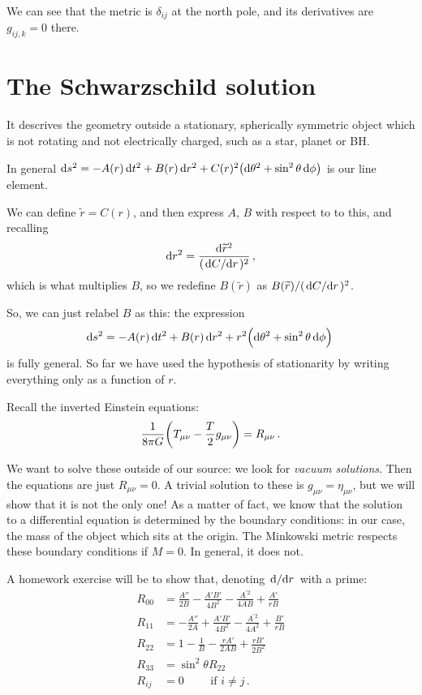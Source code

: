 \documentclass[main.tex]{subfiles}
\begin{document}
We can see that the metric is \(\delta_{ij}\) at the north pole, and its derivatives are \(g_{ij,k}= 0\) there.

\section{The Schwarzschild solution}

It descrives the geometry outside a stationary, spherically symmetric object which is not rotating and not electrically charged, such as a star, planet or BH.

In general \(\dd{s^2} = -A(r) \dd{t^2} + B(r) \dd{r^2} + C(r)^2 \qty(\dd{\theta^2} + \sin^2 \theta \dd{\phi })\) is our line element.

We can define \(\widetilde{r} = C(r)\), and then express \(A\), \(B\) with respect to to this, and recalling 
%
\begin{align}
    \dd{r^2} = 
  \frac{\dd{\widetilde{r}^2} }{(\dv*{C}{r})^2}
\,,
\end{align}
%
which is what multiplies \(B\), so we redefine \(B(\widetilde{r}) \) as \(B(\widetilde{r}) / (\dv*{C}{r})^2\).

So, we can just relabel \(B\) as this: the expression 
%
\begin{align}
    \dd{s^2} = -A(r) \dd{t^2} + B(r) \dd{r^2} + r^2\qty(\dd{\theta^2} + \sin^2 \theta \dd{\phi })
\,
\end{align}
%
is fully general. So far we have used the hypothesis of stationarity by writing everything only as a function of \(r\).

Recall the inverted Einstein equations: 
%
\begin{align}
  \frac{1}{8 \pi G} \qty(T_{\mu \nu } - \frac{T}{2} g_{\mu \nu }) = R_{\mu \nu }
\,.
\end{align}
%

We want to solve these outside of our source: we look for \emph{vacuum solutions}. Then the equations are just \(R_{\mu \nu } =0\).
A trivial solution to these is \(g_{\mu \nu } = \eta_{\mu \nu }\), but we will show that it is not the only one!
As a matter of fact, we know that the solution to a differential equation is determined by the boundary conditions: in our case, the mass of the object which sits at the origin.
The Minkowski metric respects these boundary conditions if \(M=0\). In general, it does not.

A homework exercise will be to show that, denoting \(\dv*{}{r}\) with a prime: 
%
\begin{subequations}
\begin{align}
    R_{00} &= \frac{A''}{2B} - \frac{A' B'}{4B^2} - \frac{A^{\prime 2}}{4AB} + \frac{A'}{rB}  \\
    R_{11} &= -\frac{A''}{2A} + \frac{A' B'}{4B^2} - \frac{A^{\prime 2}}{4A^2} + \frac{B'}{rB} \\
    R_{22} &= 1 - \frac{1}{B} - \frac{r A' }{2 AB} + \frac{rB'}{2 B^2}  \\
    R_{33} &= \sin^2 \theta  R_{22} \\
    R_{ij} &= 0 \qquad \text{ if } i \neq j
\,.
\end{align}
\end{subequations}
\end{document}
